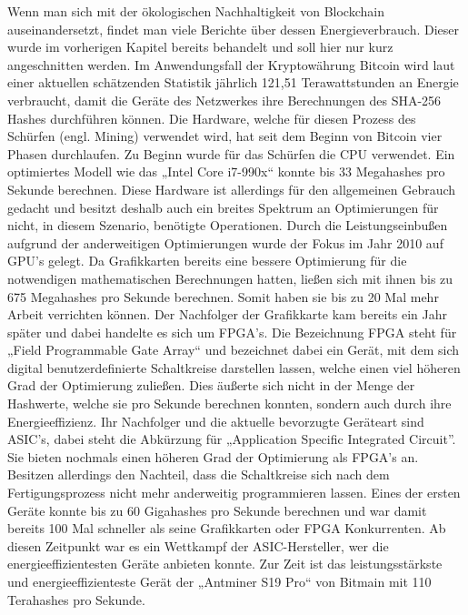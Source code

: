 Wenn man sich mit der ökologischen Nachhaltigkeit von Blockchain auseinandersetzt, findet man viele Berichte über dessen Energieverbrauch. Dieser wurde im vorherigen Kapitel bereits behandelt und soll hier nur kurz angeschnitten werden. Im Anwendungsfall der Kryptowährung Bitcoin wird laut einer aktuellen schätzenden Statistik \cite{de_vries_bitcoin_nodate} jährlich 121,51 Terawattstunden an Energie verbraucht, damit die Geräte des Netzwerkes ihre Berechnungen des SHA-256 Hashes durchführen können. Die Hardware, welche für diesen Prozess des Schürfen (engl. Mining) verwendet wird, hat seit dem Beginn von Bitcoin vier Phasen \cite{taylor_evolution_2017} durchlaufen.
\newline
Zu Beginn wurde für das Schürfen die CPU verwendet. Ein optimiertes Modell wie das „Intel Core i7-990x“ konnte bis 33 Megahashes pro Sekunde berechnen. Diese Hardware ist allerdings für den allgemeinen Gebrauch gedacht und besitzt deshalb auch ein breites Spektrum an Optimierungen für nicht, in diesem Szenario, benötigte Operationen. Durch die Leistungseinbußen aufgrund der anderweitigen Optimierungen wurde der Fokus im Jahr 2010 auf GPU’s gelegt. Da Grafikkarten bereits eine bessere Optimierung für die notwendigen mathematischen Berechnungen hatten, ließen sich mit ihnen bis zu 675 Megahashes pro Sekunde berechnen. Somit haben sie bis zu 20 Mal mehr Arbeit verrichten können.
\newline
Der Nachfolger der Grafikkarte kam bereits ein Jahr später und dabei handelte es sich um FPGA’s. Die Bezeichnung FPGA steht für „Field Programmable Gate Array“ und bezeichnet dabei ein Gerät, mit dem sich digital benutzerdefinierte Schaltkreise darstellen lassen, welche einen viel höheren Grad der Optimierung zuließen. Dies äußerte sich nicht in der Menge der Hashwerte, welche sie pro Sekunde berechnen konnten, sondern auch durch ihre Energieeffizienz. Ihr Nachfolger und die aktuelle bevorzugte Geräteart sind ASIC’s, dabei steht die Abkürzung für „Application Specific Integrated Circuit”. Sie bieten nochmals einen höheren Grad der Optimierung als FPGA’s an. Besitzen allerdings den Nachteil, dass die Schaltkreise sich nach dem Fertigungsprozess nicht mehr anderweitig programmieren lassen. Eines der ersten Geräte konnte bis zu 60 Gigahashes pro Sekunde berechnen und war damit bereits 100 Mal schneller als seine Grafikkarten oder FPGA Konkurrenten. Ab diesen Zeitpunkt  war es ein Wettkampf der ASIC-Hersteller, wer die energieeffizientesten Geräte anbieten konnte. Zur Zeit ist das leistungsstärkste und energieeffizienteste Gerät der „Antminer S19 Pro“ \cite{michel_rauchs_cbeci_nodate} von Bitmain mit 110 Terahashes pro Sekunde.
